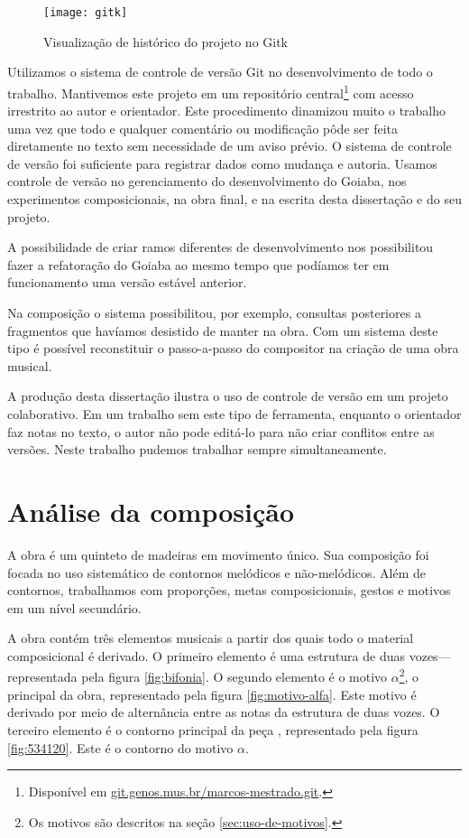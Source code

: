 \begin{figure}
  \centering
  \texttt{[image: gitk]}
  \caption{Visualização de histórico do projeto no Gitk}
  \label{fig:historico-git}
\end{figure}

Utilizamos o sistema de controle de versão Git no desenvolvimento de
todo o trabalho. Mantivemos este projeto em um repositório
central\footnote{Disponível em
  \url{git.genos.mus.br/marcos-mestrado.git}.} com acesso irrestrito
ao autor e orientador. Este procedimento dinamizou muito o trabalho
uma vez que todo e qualquer comentário ou modificação pôde ser feita
diretamente no texto sem necessidade de um aviso prévio. O sistema de
controle de versão foi suficiente para registrar dados como mudança e
autoria. Usamos controle de versão no gerenciamento do desenvolvimento
do Goiaba, nos experimentos composicionais, na obra final, e na
escrita desta dissertação e do seu projeto.

A possibilidade de criar ramos diferentes de desenvolvimento nos
possibilitou fazer a refatoração do Goiaba ao mesmo tempo que podíamos
ter em funcionamento uma versão estável anterior.

Na composição o sistema possibilitou, por exemplo, consultas
posteriores a fragmentos que havíamos desistido de manter na obra. Com
um sistema deste tipo é possível reconstituir o passo-a-passo do
compositor na criação de uma obra musical.

A produção desta dissertação ilustra o uso de controle de versão em um
projeto colaborativo. Em um trabalho sem este tipo de ferramenta,
enquanto o orientador faz notas no texto, o autor não pode editá-lo
para não criar conflitos entre as versões. Neste trabalho pudemos
trabalhar sempre simultaneamente.


\chapter{Análise da composição}
\label{cha:anal-da-comp}

A obra \obra{} é um quinteto de madeiras em movimento único. Sua
composição foi focada no uso sistemático de contornos melódicos e
não-melódicos. Além de contornos, trabalhamos com proporções, metas
composicionais, gestos e motivos em um nível secundário.

A obra contém três elementos musicais a partir dos quais todo o
material composicional é derivado. O primeiro elemento é uma estrutura
de duas vozes---representada pela figura \ref{fig:bifonia}. O segundo
elemento é o motivo $\alpha$\footnote{Os motivos são descritos na
  seção \ref{sec:uso-de-motivos}.}, o principal da obra, representado
pela figura \ref{fig:motivo-alfa}. Este motivo é derivado por meio de
alternância entre as notas da estrutura de duas vozes. O terceiro
elemento é o contorno principal da peça \contpr{}, representado pela
figura \ref{fig:534120}. Este é o contorno do motivo $\alpha$.

